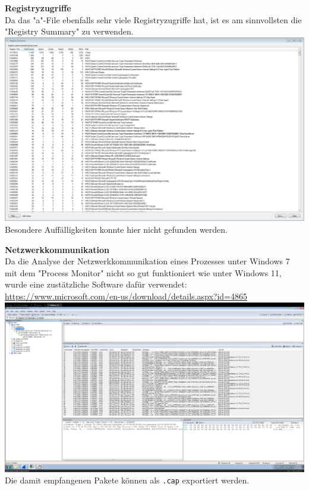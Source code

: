 \documentclass{article}
\begin{document}
	\pagebreak
	
	\noindent \textbf{Registryzugriffe}\\
	Da das "a"-File ebenfalls sehr viele Registryzugriffe hat, ist es am sinnvollsten die "Registry Summary" zu verwenden.\\
	\includegraphics[width=1\linewidth]{"pictures/2.3 Registry Summary"}\\
	Besondere Auffälligkeiten konnte hier nicht gefunden werden.\\
	
	\pagebreak
	
	\noindent \textbf{Netzwerkkommunikation}\\
	Da die Analyse der Netzwerkkommunikation eines Prozesses unter Windows 7 mit dem "Process Monitor" nicht so gut funktioniert wie unter Windows 11, wurde eine zustätzliche Software dafür verwendet:\\
	\url{https://www.microsoft.com/en-us/download/details.aspx?id=4865}\\
	\includegraphics[width=1\linewidth]{"pictures/2.4 Network Monitor"}\\
	Die damit empfangenen Pakete können als \texttt{.cap} exportiert werden.\\
\end{document}
